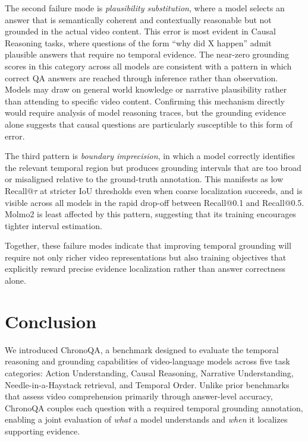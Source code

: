 \documentclass[sigconf,natbib=false,nonacm]{acmart}
\begin{document}
The second failure mode is \textit{plausibility substitution}, where a model selects an answer that is semantically coherent and contextually reasonable but not grounded in the actual video content. This error is most evident in Causal Reasoning tasks, where questions of the form ``why did X happen'' admit plausible answers that require no temporal evidence. The near-zero grounding scores in this category across all models are consistent with a pattern in which correct QA answers are reached through inference rather than observation. Models may draw on general world knowledge or narrative plausibility rather than attending to specific video content. Confirming this mechanism directly would require analysis of model reasoning traces, but the grounding evidence alone suggests that causal questions are particularly susceptible to this form of error.


The third pattern is \textit{boundary imprecision}, in which a model correctly identifies the relevant temporal region but produces grounding intervals that are too broad or misaligned relative to the ground-truth annotation. This manifests as low Recall@$\tau$ at stricter IoU thresholds even when coarse localization succeeds, and is visible across all models in the rapid drop-off between Recall@0.1 and Recall@0.5. Molmo2 is least affected by this pattern, suggesting that its training encourages tighter interval estimation.

Together, these failure modes indicate that improving temporal grounding will require not only richer video representations but also training objectives that explicitly reward precise evidence localization rather than answer correctness alone.

\section{Conclusion}
We introduced ChronoQA, a benchmark designed to evaluate the temporal reasoning and grounding capabilities of video-language models across five task categories: Action Understanding, Causal Reasoning, Narrative Understanding, Needle-in-a-Haystack retrieval, and Temporal Order. Unlike prior benchmarks that assess video comprehension primarily through answer-level accuracy, ChronoQA couples each question with a required temporal grounding annotation, enabling a joint evaluation of \textit{what} a model understands and \textit{when} it localizes supporting evidence.
\end{document}
